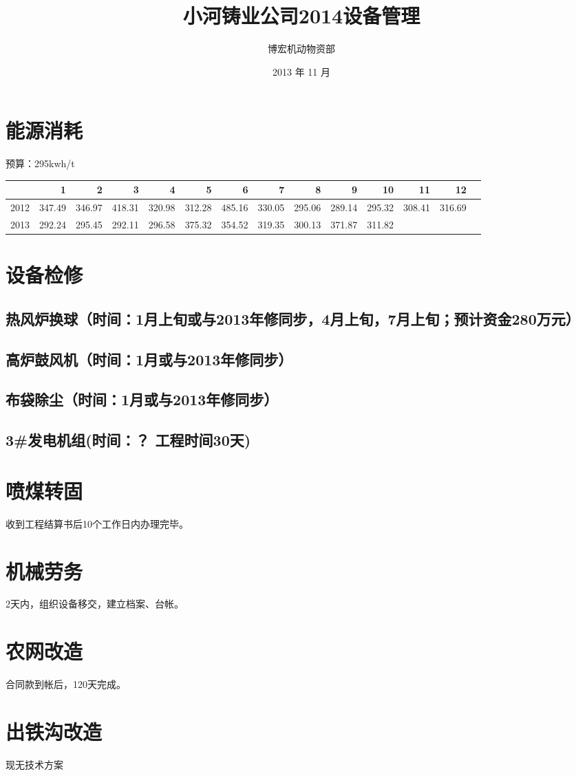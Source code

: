 \documentclass[11pt,a4paper]{ctexart}
\title{小河铸业公司2014设备管理}
\author{博宏机动物资部}
\date{2013 年 11 月}
\begin{document}
\maketitle

\setcounter{tocdepth}{3}
\tableofcontents
\vspace*{1cm}

\section{能源消耗}
\label{sec-1}

预算：295kwh/t

\begin{center}
\begin{tabular}{rrrrrrrrrrrrrl}
\hline
       &       1  &       2  &       3  &       4  &       5  &       6  &       7  &       8  &       9  &      10  &      11  &      12  &     \\
\hline
 2012  &  347.49  &  346.97  &  418.31  &  320.98  &  312.28  &  485.16  &  330.05  &  295.06  &  289.14  &  295.32  &  308.41  &  316.69  &     \\
\hline
 2013  &  292.24  &  295.45  &  292.11  &  296.58  &  375.32  &  354.52  &  319.35  &  300.13  &  371.87  &  311.82  &          &          &     \\
\hline
\end{tabular}
\end{center}
\section{设备检修}
\label{sec-2}
\subsection{热风炉换球（时间：1月上旬或与2013年修同步，4月上旬，7月上旬；预计资金280万元）}
\label{sec-2-1}
\subsection{高炉鼓风机（时间：1月或与2013年修同步）}
\label{sec-2-2}
\subsection{布袋除尘（时间：1月或与2013年修同步）}
\label{sec-2-3}
\subsection{3\#发电机组(时间：？ 工程时间30天)}
\label{sec-2-4}
\section{喷煤转固}
\label{sec-3}

收到工程结算书后10个工作日内办理完毕。
\section{机械劳务}
\label{sec-4}

2天内，组织设备移交，建立档案、台帐。
\section{农网改造}
\label{sec-5}

合同款到帐后，120天完成。
\section{出铁沟改造}
\label{sec-6}

现无技术方案
\end{document}
